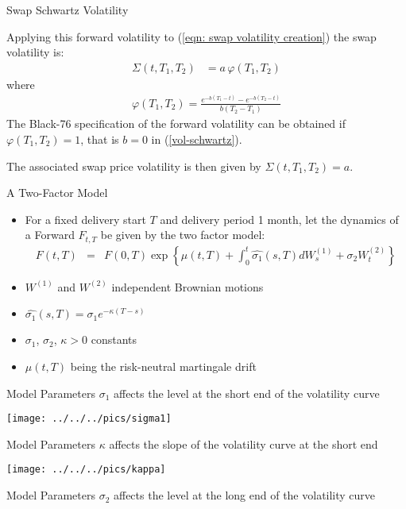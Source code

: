{Swap Schwartz Volatility}

Applying this forward volatility to (\ref{eqn: swap volatility creation}) the swap volatility is:
\begin{align}
\Sigma(t,T_1,T_2)&=a\,\varphi(T_1,T_2)
\end{align}
where
\begin{align}
\varphi(T_1,T_2)= \frac{e^{-b(T_1-t)}-e^{-b(T_2-t)}}{b(T_2-T_1)}
\label{volatility function varphi}
\end{align}
The Black-76 specification of the forward volatility can be obtained if $\varphi(T_1,T_2) =1$, that is $b=0$
in (\ref{vol-schwartz}).

The associated swap price volatility is then given by $\Sigma(t,T_1,T_2)=a$.

{A Two-Factor Model}
\begin{itemize}
\item<1-> For a fixed delivery start $T$ and delivery period 1 month, let the dynamics of a Forward $F_{t,T}$ be given by the two factor model:
\begin{eqnarray*}
F(t,T)& =&F(0,T)\exp\left\{\mu(t,T)  +\int_0^t\hat{\sigma_1}(s,T)dW_s^{(1)}+\sigma_2W_t^{(2)}\right\}
\end{eqnarray*}

\item<2-> $W^{(1)}$ and $W^{(2)}$ independent Brownian motions
\item<3-> $\hat{\sigma_1}(s,T)=\sigma_1e^{-\kappa(T-s)}$
\item<4-> $\sigma_1$, $\sigma_2$, $\kappa>0$ constants
\item<5-> $\mu(t,T)$ being the risk-neutral martingale drift
\end{itemize}

{Model Parameters}
$\sigma_1$ affects the level at the short end of the volatility curve

\begin{center}
\texttt{[image: ../../../pics/sigma1]}
\end{center}

{Model Parameters}
$\kappa$ affects the slope of the volatility curve at the short end

\begin{center}
\texttt{[image: ../../../pics/kappa]}
\end{center}

{Model Parameters}
$\sigma_2$ affects the level at the long end of the volatility curve

